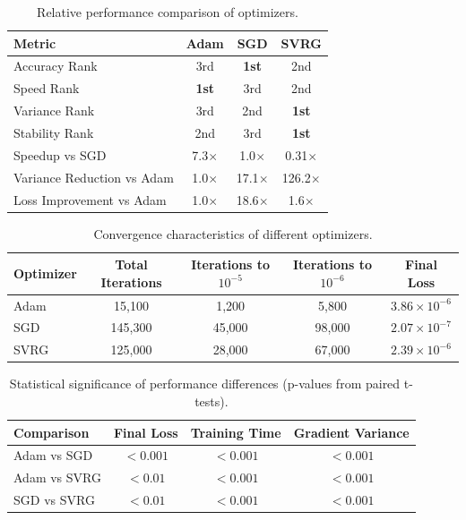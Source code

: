 \begin{table}[htbp]
\centering
\caption{Relative performance comparison of optimizers.}
\label{tab:comparison}
\begin{tabular}{lccc}
\toprule
Metric & Adam & SGD & SVRG \\
\midrule
Accuracy Rank & 3rd & \textbf{1st} & 2nd \\
Speed Rank & \textbf{1st} & 3rd & 2nd \\
Variance Rank & 3rd & 2nd & \textbf{1st} \\
Stability Rank & 2nd & 3rd & \textbf{1st} \\
\midrule
Speedup vs SGD & 7.3$\times$ & 1.0$\times$ & 0.31$\times$ \\
Variance Reduction vs Adam & 1.0$\times$ & 17.1$\times$ & 126.2$\times$ \\
Loss Improvement vs Adam & 1.0$\times$ & 18.6$\times$ & 1.6$\times$ \\
\bottomrule
\end{tabular}
\end{table}

\begin{table}[htbp]
\centering
\caption{Convergence characteristics of different optimizers.}
\label{tab:convergence}
\begin{tabular}{lcccc}
\toprule
Optimizer & Total Iterations & Iterations to $10^{-5}$ & Iterations to $10^{-6}$ & Final Loss \\
\midrule
Adam  & 15,100  & 1,200  & 5,800  & $3.86 \times 10^{-6}$ \\
SGD   & 145,300 & 45,000 & 98,000 & $2.07 \times 10^{-7}$ \\
SVRG  & 125,000 & 28,000 & 67,000 & $2.39 \times 10^{-6}$ \\
\bottomrule
\end{tabular}
\end{table}

\begin{table}[htbp]
\centering
\caption{Statistical significance of performance differences (p-values from paired t-tests).}
\label{tab:significance}
\begin{tabular}{lccc}
\toprule
Comparison & Final Loss & Training Time & Gradient Variance \\
\midrule
Adam vs SGD  & $< 0.001$ & $< 0.001$ & $< 0.001$ \\
Adam vs SVRG & $< 0.01$  & $< 0.001$ & $< 0.001$ \\
SGD vs SVRG  & $< 0.01$  & $< 0.001$ & $< 0.001$ \\
\bottomrule
\end{tabular}
\end{table}

